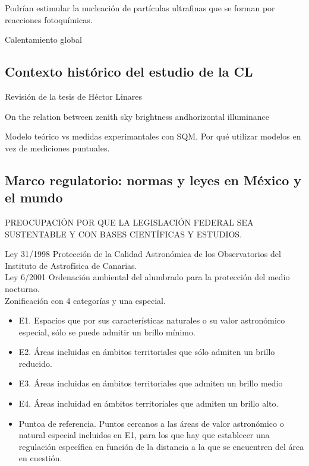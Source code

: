 Podrían estimular la nucleación de partículas ultrafinas que se forman por reacciones fotoquímicas.

Calentamiento global 

\subsection{Contexto histórico del estudio de la CL}

Revisión de la tesis de Héctor Linares

On the relation between zenith sky brightness andhorizontal illuminance

Modelo teórico vs medidas experimantales con SQM, Por qué utilizar modelos en vez de mediciones puntuales.

\subsection{Marco regulatorio: normas y leyes en México y el mundo}

PREOCUPACIÓN POR QUE LA LEGISLACIÓN FEDERAL SEA SUSTENTABLE Y CON BASES CIENTÍFICAS Y ESTUDIOS.

Ley 31/1998 Protección de la Calidad Astronómica de los Observatorios del Instituto de Astrofísica de Canarias.\\

Ley 6/2001 Ordenación ambiental del alumbrado para la protección del medio nocturno.\\

Zonificación con 4 categorías y una especial.\\

\begin{itemize}

    \item E1. Espacios que por sus características naturales o su valor astronómico especial, sólo se puede admitir un brillo mínimo.
    
    \item E2. Áreas incluidas en ámbitos territoriales que sólo admiten un brillo reducido.
    
    \item E3. Áreas incluidas en ámbitos territoriales que admiten un brillo medio
    
    \item E4. Áreas incluidad en ámbitos territoriales que admiten un brillo alto.
    
    \item Puntoa de referencia. Puntos cercanos a las áreas de valor astronómico o natural especial incluidos en E1, para los que hay que establecer una regulación específica en función de la distancia a la que se encuentren del área en cuestión.
    
    
\end{itemize}

